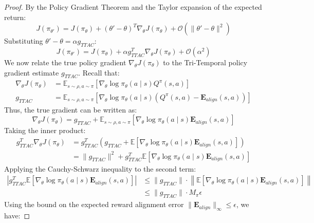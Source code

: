 \documentclass[manuscript, screen, review]{jair}
\begin{document}
\begin{proof}
By the Policy Gradient Theorem and the Taylor expansion of the expected return:
\begin{equation*}
    J(\pi_{\theta'}) = J(\pi_\theta) + (\theta' - \theta)^T \nabla_\theta J(\pi_\theta) + \mathcal{O}(\|\theta' - \theta\|^2)
\end{equation*}
Substituting $\theta' - \theta = \alpha g_{TTAC}$:
\begin{equation*}
    J(\pi_{\theta'}) = J(\pi_\theta) + \alpha g_{TTAC}^T \nabla_\theta J(\pi_\theta) + \mathcal{O}(\alpha^2)
\end{equation*}
We now relate the true policy gradient $\nabla_\theta J(\pi_\theta)$ to the Tri-Temporal policy gradient estimate $g_{TTAC}$. Recall that:
\begin{align*}
    \nabla_\theta J(\pi_\theta) &= \mathbb{E}_{s \sim \rho, a \sim \pi} \left[ \nabla_\theta \log \pi_\theta(a \mid s) Q^\pi(s, a) \right] \\
    g_{TTAC} &= \mathbb{E}_{s \sim \rho, a \sim \pi} \left[ \nabla_\theta \log \pi_\theta(a \mid s) \left( Q^\pi(s, a) - \mathbf{E}_{align}(s, a) \right) \right]
\end{align*}
Thus, the true gradient can be written as:
\begin{equation*}
    \nabla_\theta J(\pi_\theta) = g_{TTAC} + \mathbb{E}_{s \sim \rho, a \sim \pi} \left[ \nabla_\theta \log \pi_\theta(a \mid s) \mathbf{E}_{align}(s, a) \right]
\end{equation*}
Taking the inner product:
\begin{align*}
    g_{TTAC}^T \nabla_\theta J(\pi_\theta) &= g_{TTAC}^T \left( g_{TTAC} + \mathbb{E} \left[ \nabla_\theta \log \pi_\theta(a \mid s) \mathbf{E}_{align}(s, a) \right] \right) \\
    &= \| g_{TTAC} \|^2 + g_{TTAC}^T \mathbb{E} \left[ \nabla_\theta \log \pi_\theta(a \mid s) \mathbf{E}_{align}(s, a) \right]
\end{align*}
Applying the Cauchy-Schwarz inequality to the second term:
\begin{align*}
    \left| g_{TTAC}^T \mathbb{E} \left[ \nabla_\theta \log \pi_\theta(a \mid s) \mathbf{E}_{align}(s, a) \right] \right| &\le \| g_{TTAC} \| \cdot \left\| \mathbb{E} \left[ \nabla_\theta \log \pi_\theta(a \mid s) \mathbf{E}_{align}(s, a) \right] \right\| \\
    &\le \| g_{TTAC} \| \cdot M_\pi \epsilon
\end{align*}
Using the bound on the expected reward alignment error $\|\mathbf{E}_{align}\|_\infty \le \epsilon$, we have:

\end{proof}
\end{document}

